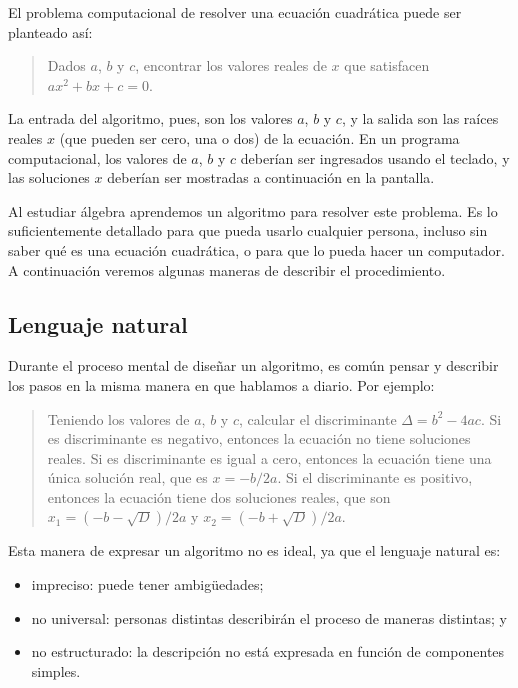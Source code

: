 El problema computacional de resolver una ecuación cuadrática puede ser
planteado así:

\begin{quote}
Dados \(a\), \(b\) y \(c\), encontrar los valores reales de \(x\) que satisfacen
\(ax^2 + bx + c = 0\).
\end{quote}

La entrada del algoritmo, pues, son los valores \(a\), \(b\) y \(c\), y la
salida son las raíces reales \(x\) (que pueden ser cero, una o dos) de la
ecuación. En un programa computacional, los valores de \(a\), \(b\) y \(c\)
deberían ser ingresados usando el teclado, y las soluciones \(x\) deberían
ser mostradas a continuación en la pantalla.

Al estudiar álgebra aprendemos un algoritmo para resolver este problema.
Es lo suficientemente detallado para que pueda usarlo cualquier persona,
incluso sin saber qué es una ecuación cuadrática, o para que lo pueda
hacer un computador. A continuación veremos algunas maneras de describir
el procedimiento.

\subsection{Lenguaje natural}

Durante el proceso mental de diseñar un algoritmo, es común pensar y
describir los pasos en la misma manera en que hablamos a diario. Por
ejemplo:

\begin{quote}
Teniendo los valores de \(a\), \(b\) y \(c\), calcular el discriminante
\(\Delta = b^2 - 4ac\). Si es discriminante es negativo, entonces la ecuación no
tiene soluciones reales. Si es discriminante es igual a cero, entonces
la ecuación tiene una única solución real, que es \(x = -b/2a\). Si el
discriminante es positivo, entonces la ecuación tiene dos soluciones
reales, que son \(x_1 = (-b - \sqrt{D})/2a\) y \(x_2 = (-b + \sqrt{D})/2a\).
\end{quote}

Esta manera de expresar un algoritmo no es ideal, ya que el lenguaje
natural es:

\begin{itemize}
\item
  impreciso: puede tener ambigüedades;
\item
  no universal: personas distintas describirán el proceso de maneras
  distintas; y
\item
  no estructurado: la descripción no está expresada en función de
  componentes simples.
\end{itemize}

